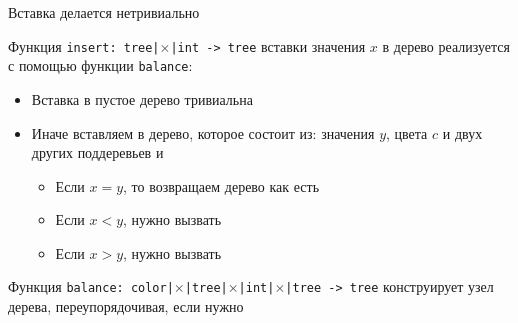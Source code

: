 \begin{frame}{Вставка делается нетривиально}

Функция \texttt{insert: tree|$\times$|int -> tree} вставки значения $x$ в дерево реализуется с помощью функции 
\texttt{balance}:
\begin{itemize}
\item Вставка в пустое дерево тривиальна
\item Иначе вставляем в  дерево, которое состоит из: значения $y$, цвета $c$ и двух других поддеревьев  и 
\begin{itemize}
\item Если $x=y$, то возвращаем дерево как есть
\item Если $x<y$, нужно вызвать  
\item Если $x>y$, нужно вызвать  
\end{itemize}
\end{itemize}
\vspace{2em}
Функция \texttt{balance: color|$\times$|tree|$\times$|int|$\times$|tree -> tree} конструирует узел дерева, переупорядочивая, если нужно
\end{frame}


%
%
%



